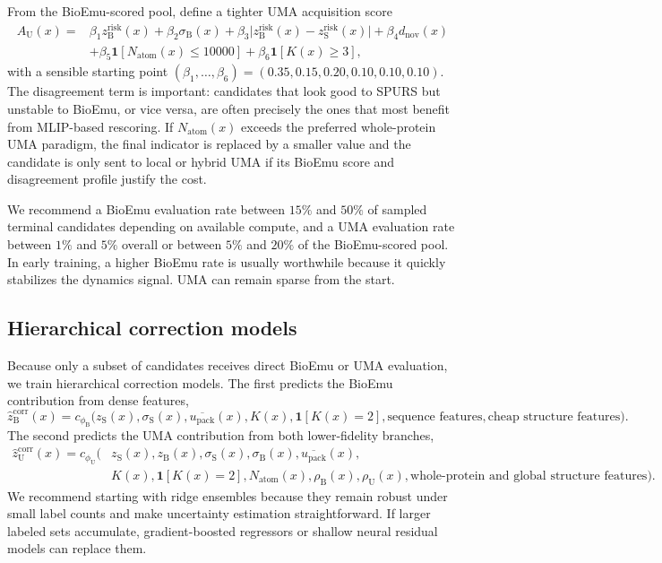 \documentclass[11pt]{article}
\newcommand{\packunc}{\ensuremath{u_{\mathrm{pack}}}}
\begin{document}
From the BioEmu-scored pool, define a tighter UMA acquisition score
\begin{equation}
\label{eq:acquma}
\begin{aligned}
    A_{\mathrm U}(x)={}&\beta_1 z_{\mathrm B}^{\mathrm{risk}}(x)+\beta_2 \sigma_{\mathrm B}(x)+\beta_3 \big|z_{\mathrm B}^{\mathrm{risk}}(x)-z_{\mathrm S}^{\mathrm{risk}}(x)\big|+\beta_4 d_{\mathrm{nov}}(x)\\
    &+\beta_5 \mathbf{1}[N_{\mathrm{atom}}(x)\leq 10000]+\beta_6 \mathbf{1}[K(x)\ge 3],
\end{aligned}
\end{equation}
with a sensible starting point $(\beta_1,\ldots,\beta_6)=(0.35,0.15,0.20,0.10,0.10,0.10)$. The disagreement term is important: candidates that look good to SPURS but unstable to BioEmu, or vice versa, are often precisely the ones that most benefit from MLIP-based rescoring. If $N_{\mathrm{atom}}(x)$ exceeds the preferred whole-protein UMA paradigm, the final indicator is replaced by a smaller value and the candidate is only sent to local or hybrid UMA if its BioEmu score and disagreement profile justify the cost.

We recommend a BioEmu evaluation rate between $15\%$ and $50\%$ of sampled terminal candidates depending on available compute, and a UMA evaluation rate between $1\%$ and $5\%$ overall or between $5\%$ and $20\%$ of the BioEmu-scored pool. In early training, a higher BioEmu rate is usually worthwhile because it quickly stabilizes the dynamics signal. UMA can remain sparse from the start.



\subsection{Hierarchical correction models}

Because only a subset of candidates receives direct BioEmu or UMA evaluation, we train hierarchical correction models. The first predicts the BioEmu contribution from dense features,
\begin{equation}
    \widehat z_{\mathrm B}^{\mathrm{corr}}(x)=c_{\phi_{\mathrm B}}\big(z_{\mathrm S}(x),\sigma_{\mathrm S}(x),\overline{\packunc}(x),K(x),\mathbf{1}[K(x)=2],\text{sequence features},\text{cheap structure features}\big).
\end{equation}
The second predicts the UMA contribution from both lower-fidelity branches,
\begin{equation}
\begin{aligned}
    \widehat z_{\mathrm U}^{\mathrm{corr}}(x)=c_{\phi_{\mathrm U}}\big(&z_{\mathrm S}(x),z_{\mathrm B}(x),\sigma_{\mathrm S}(x),\sigma_{\mathrm B}(x),\overline{\packunc}(x),\\
    &K(x),\mathbf{1}[K(x)=2],N_{\mathrm{atom}}(x),\rho_{\mathrm B}(x),\rho_{\mathrm U}(x),\text{whole-protein and global structure features}\big).
\end{aligned}
\end{equation}
We recommend starting with ridge ensembles because they remain robust under small label counts and make uncertainty estimation straightforward. If larger labeled sets accumulate, gradient-boosted regressors or shallow neural residual models can replace them.
\end{document}
